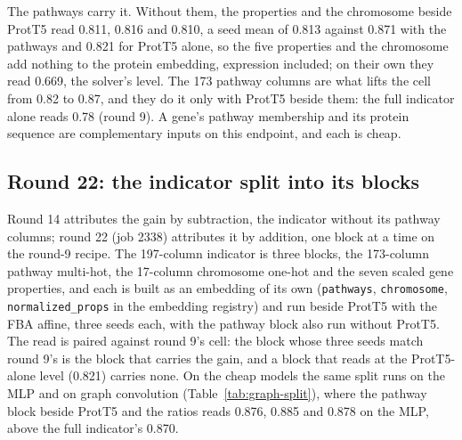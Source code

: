 The pathways carry it. Without them, the properties and the chromosome beside ProtT5
read 0.811, 0.816 and 0.810, a seed mean of 0.813 against 0.871 with the pathways and
0.821 for ProtT5 alone, so the five properties and the chromosome add nothing to the
protein embedding, expression included; on their own they read 0.669, the solver's
level. The 173 pathway columns are what lifts the cell from 0.82 to 0.87, and they do
it only with ProtT5 beside them: the full indicator alone reads 0.78 (round 9). A
gene's pathway membership and its protein sequence are complementary inputs on this
endpoint, and each is cheap.

\subsection{Round 22: the indicator split into its blocks}
\label{sec:round22}

Round 14 attributes the gain by subtraction, the indicator without its pathway
columns; round 22 (job 2338) attributes it by addition, one block at a time on the
round-9 recipe. The 197-column indicator is three blocks, the 173-column pathway
multi-hot, the 17-column chromosome one-hot and the seven scaled gene properties, and
each is built as an embedding of its own (\texttt{pathways}, \texttt{chromosome},
\texttt{normalized\_props} in the embedding registry) and run beside ProtT5 with the
FBA affine, three seeds each, with the pathway block also run without ProtT5. The read
is paired against round 9's cell: the block whose three seeds match round 9's is the
block that carries the gain, and a block that reads at the ProtT5-alone level (0.821)
carries none. On the cheap models the same split runs on the MLP and on graph
convolution (Table~\ref{tab:graph-split}), where the pathway block beside ProtT5 and
the ratios reads 0.876, 0.885 and 0.878 on the MLP, above the full indicator's 0.870.




